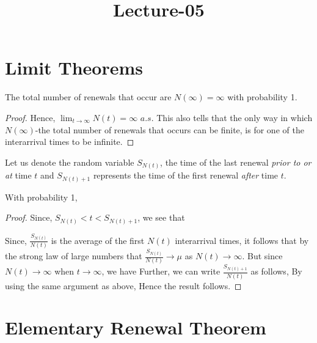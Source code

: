 \documentclass[a4paper,10pt, english]{article}
\title{Lecture-05}
\author{}
\begin{document}
\maketitle
\section{Limit Theorems}
\begin{prop}
The total number of renewals that occur are $N(\infty)=\infty$ with probability 1.
\end{prop}
\begin{proof}
Hence, $\lim_{t\to\infty} N(t) = \infty$ $a.s$.
This also tells that the only way in which $N(\infty)$-the total number of renewals that occurs can be finite, is for one of the interarrival times to be infinite.
\end{proof}

Let us denote the random variable $S_{N(t)}$, the time of the last renewal \textit{prior to or at} time $t$ and $S_{N(t)+1}$ represents the time of the first renewal \textit{after} time $t$.

\begin{prop}
With probability 1,
\end{prop}

\begin{proof}
Since, $S_{N(t)} < t < S_{N(t)+1}$, we see that

Since, $\frac{S_{N(t)}}{N(t)}$ is the average of the first $N(t)$ interarrival times, it follows that by the strong law of large numbers that 
$\frac{S_{N(t)}}{N(t)} \to \mu$ as $N(t) \to \infty$. But since $N(t)\to \infty$ when $t \to \infty$, we have
Further, we can write $\frac{S_{N(t)+1}}{N(t)}$ as follows,
By using the same argument as above,
Hence the result follows.
\end{proof}

\section{Elementary Renewal Theorem}
\begin{thm}
\end{thm}
\end{document}
